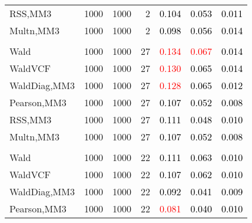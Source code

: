 \documentclass[
]{article}
\begin{document}
\begin{table}[H]
{\begin{tabular}[t]{lrrrrrr}
\hspace{1em}RSS,MM3 & 1000 & 1000 & 2 & \textcolor{black}{0.104} & \textcolor{black}{0.053} & \textcolor{black}{0.011}\\
\hspace{1em}Multn,MM3 & 1000 & 1000 & 2 & \textcolor{black}{0.098} & \textcolor{black}{0.056} & \textcolor{black}{0.014}\\
\addlinespace[0.3em]
\multicolumn{7}{l}{\textbf{1F 15V}}\\
\hspace{1em}Wald & 1000 & 1000 & 27 & \textcolor{red}{0.134} & \textcolor{red}{0.067} & \textcolor{black}{0.014}\\
\hspace{1em}WaldVCF & 1000 & 1000 & 27 & \textcolor{red}{0.130} & \textcolor{black}{0.065} & \textcolor{black}{0.014}\\
\hspace{1em}WaldDiag,MM3 & 1000 & 1000 & 27 & \textcolor{red}{0.128} & \textcolor{black}{0.065} & \textcolor{black}{0.012}\\
\hspace{1em}Pearson,MM3 & 1000 & 1000 & 27 & \textcolor{black}{0.107} & \textcolor{black}{0.052} & \textcolor{black}{0.008}\\
\hspace{1em}RSS,MM3 & 1000 & 1000 & 27 & \textcolor{black}{0.111} & \textcolor{black}{0.048} & \textcolor{black}{0.010}\\
\hspace{1em}Multn,MM3 & 1000 & 1000 & 27 & \textcolor{black}{0.107} & \textcolor{black}{0.052} & \textcolor{black}{0.008}\\
\addlinespace[0.3em]
\multicolumn{7}{l}{\textbf{2F 10V}}\\
\hspace{1em}Wald & 1000 & 1000 & 22 & \textcolor{black}{0.111} & \textcolor{black}{0.063} & \textcolor{black}{0.010}\\
\hspace{1em}WaldVCF & 1000 & 1000 & 22 & \textcolor{black}{0.107} & \textcolor{black}{0.062} & \textcolor{black}{0.010}\\
\hspace{1em}WaldDiag,MM3 & 1000 & 1000 & 22 & \textcolor{black}{0.092} & \textcolor{black}{0.041} & \textcolor{black}{0.009}\\
\hspace{1em}Pearson,MM3 & 1000 & 1000 & 22 & \textcolor{red}{0.081} & \textcolor{black}{0.040} & \textcolor{black}{0.010}\\

\end{tabular}}
\end{table}
\end{document}

